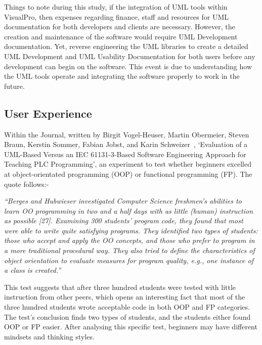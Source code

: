 \documentclass[12pt]{report} %
\begin{document}
			Things to note during this study, if the integration of UML tools within VisualPro, then expenses regarding finance, staff and resources for UML documentation for both developers and clients are necessary. However, the creation and maintenance of the software would require UML Development documentation. Yet, reverse engineering the UML libraries to create a detailed UML Development and UML Usability Documentation for both users before any development can begin on the software. This event is due to understanding how the UML tools operate and integrating the software properly to work in the future.

		\subsection{User Experience}
		\label{subsec:userExperience}
			Within the Journal, written by Birgit Vogel-Heuser, Martin Obermeier, Steven Braun, Kerstin Sommer, Fabian Jobst, and Karin Schweizer~\cite{vogel-heuser_evaluation_2013}, `Evaluation of a UML-Based Versus an IEC 61131-3-Based Software Engineering Approach for Teaching PLC Programming', an experiment to test whether beginners excelled at object-orientated programming (OOP) or functional programming (FP). The quote follows:-

			\begin{center}
				\textit{``Berges and Hubwieser investigated Computer Science freshmen’s abilities to learn OO programming in two and a half days with as little (human) instruction as possible [27]. Examining 300 students’ program code, they found that most were able to write quite satisfying programs. They identified two types of students: those who accept and apply the OO concepts, and those who prefer to program in a more traditional procedural way. They also tried to define the characteristics of object orientation to evaluate measures for program quality, e.g., one instance of a class is created.''}~\cite{vogel-heuser_evaluation_2013}
			\end{center}

			This test suggests that after three hundred students were tested with little instruction from other peers, which opens an interesting fact that most of the three hundred students wrote acceptable code in both OOP and FP categories. The test's conclusion finds two types of students, and the students either found OOP or FP easier. After analysing this specific test, beginners may have different mindsets and thinking styles.
			
\end{document}
